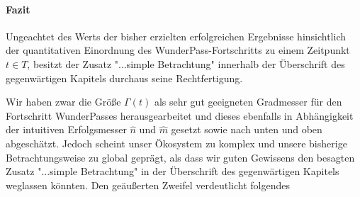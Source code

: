 
\paragraph{Fazit} 
\label{sec:eco_zahlen_zustand_wp_fazit}
\textrm{ }

\vspace{0.3cm}

Ungeachtet des Werts der bisher erzielten erfolgreichen Ergebnisse hinsichtlich der quantitativen Einordnung des WunderPass-Fortschritts zu einem Zeitpunkt $t \in T$, besitzt der Zusatz "...simple Betrachtung" innerhalb der Überschrift des gegenwärtigen Kapitels durchaus seine Rechtfertigung.

Wir haben zwar die Größe $\Gamma(t)$ als sehr gut geeigneten Gradmesser für den Fortschritt WunderPasses herausgearbeitet und dieses ebenfalls in Abhängigkeit der intuitiven Erfolgsmesser $\widehat{n}$ und $\widehat{m}$ gesetzt sowie nach unten und oben abgeschätzt. Jedoch scheint unser Ökosystem zu komplex und unsere bisherige Betrachtungsweise zu global geprägt, als dass wir guten Gewissens den besagten Zusatz "...simple Betrachtung" in der Überschrift des gegenwärtigen Kapitels weglassen könnten. Den geäußerten Zweifel verdeutlicht folgendes 

\vspace{0.3cm}

